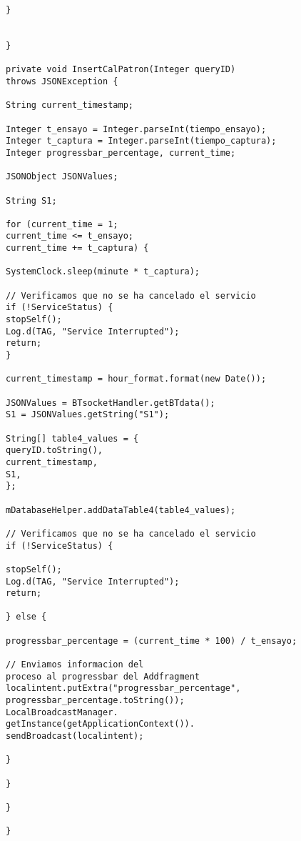 \begin{lstlisting}
}


}

private void InsertCalPatron(Integer queryID) 
throws JSONException {

String current_timestamp;

Integer t_ensayo = Integer.parseInt(tiempo_ensayo);
Integer t_captura = Integer.parseInt(tiempo_captura);
Integer progressbar_percentage, current_time;

JSONObject JSONValues;

String S1;

for (current_time = 1; 
current_time <= t_ensayo; 
current_time += t_captura) {

SystemClock.sleep(minute * t_captura);

// Verificamos que no se ha cancelado el servicio
if (!ServiceStatus) {
stopSelf();
Log.d(TAG, "Service Interrupted");
return;
}

current_timestamp = hour_format.format(new Date());

JSONValues = BTsocketHandler.getBTdata();
S1 = JSONValues.getString("S1");

String[] table4_values = {
queryID.toString(),
current_timestamp,
S1,
};

mDatabaseHelper.addDataTable4(table4_values);

// Verificamos que no se ha cancelado el servicio
if (!ServiceStatus) {

stopSelf();
Log.d(TAG, "Service Interrupted");
return;

} else {

progressbar_percentage = (current_time * 100) / t_ensayo;

// Enviamos informacion del 
proceso al progressbar del Addfragment
localintent.putExtra("progressbar_percentage",
progressbar_percentage.toString());
LocalBroadcastManager.
getInstance(getApplicationContext()).
sendBroadcast(localintent);

}

}

}

}

\end{lstlisting}